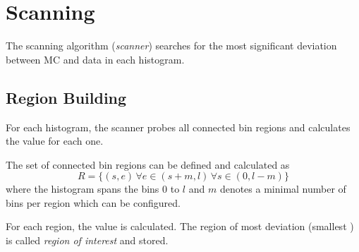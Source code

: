 \section{Scanning}
The scanning algorithm (\emph{scanner}) searches for the most significant deviation between MC and data in each histogram.

\subsection{Region Building}
For each histogram, the scanner probes all connected bin regions and calculates the \p value for each one.

The set of connected bin regions can be defined and calculated as
\begin{equation}
R = \{(s, e) \, \forall e \in (s + m, l) \, \forall s \in (0, l-m)\}
\end{equation}
where the histogram spans the bins $0$ to $l$ and $m$ denotes a minimal number of bins per region which can be configured.

For each region, the \p value is calculated. The region of most deviation (smallest \p) is called \emph{region of interest} and stored.


